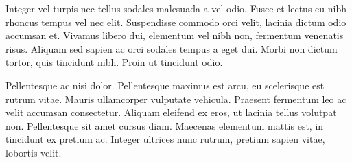 \documentclass[10pt, a4paper, twocolumn]{article} %
\begin{document}
Integer vel turpis nec tellus sodales malesuada a vel odio. Fusce et lectus eu nibh rhoncus tempus vel nec elit. Suspendisse commodo orci velit, lacinia dictum odio accumsan et. Vivamus libero dui, elementum vel nibh non, fermentum venenatis risus. Aliquam sed sapien ac orci sodales tempus a eget dui. Morbi non dictum tortor, quis tincidunt nibh. Proin ut tincidunt odio.

Pellentesque ac nisi dolor. Pellentesque maximus est arcu, eu scelerisque est rutrum vitae. Mauris ullamcorper vulputate vehicula. Praesent fermentum leo ac velit accumsan consectetur. Aliquam eleifend ex eros, ut lacinia tellus volutpat non. Pellentesque sit amet cursus diam. Maecenas elementum mattis est, in tincidunt ex pretium ac. Integer ultrices nunc rutrum, pretium sapien vitae, lobortis velit.


\printbibliography[title={Bibliography}] %

\end{document}
